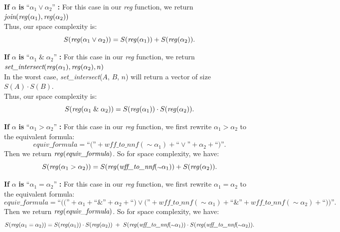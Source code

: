 \documentclass[runningheads]{llncs}
\begin{document}
\textbf{If} $\alpha$ \textbf{is} ``$\alpha_{1} \lor \alpha_{2}$'' \textbf{:}
    For this case in our \emph{reg} function, we return $\textit{join}(\text{\emph{reg}}(\alpha_{1}), \text{\emph{reg}}(\alpha_{2}))$ \\
    Thus, our space complexity is:
    \[
    S(\text{\emph{reg}}(\alpha_{1} \lor \alpha_{2})) = S(\text{\emph{reg}}(\alpha_{1})) + S(\text{\emph{reg}}(\alpha_{2})).
    \]
 

\textbf{If} $\alpha$ \textbf{is} ``$\alpha_{1} \; \& \; \alpha_{2}$'' \textbf{:}
    For this case in our \emph{reg} function, we return $ \textit{set\_intersect}(\text{\emph{reg}}(\alpha_{1}), \text{\emph{reg}}(\alpha_{2}), n)$ \\
    In the worst case, \textit{set\_intersect}($A$, $B$, $n$) will return a vector of size $S(A) \cdot S(B)$.\\
    Thus, our space complexity is:
    \[ 
    S(\text{\emph{reg}}(\alpha_{1} \; \& \; \alpha_{2})) = S(\text{\emph{reg}}(\alpha_{1})) \cdot S(\text{\emph{reg}}(\alpha_{2})).
    \]

\textbf{If} $\alpha$ \textbf{is} ``$\alpha_{1} >  \alpha_{2}$'' \textbf{:}
    For this case in our \emph{reg} function, we first rewrite $\alpha_{1} > \alpha_{2}$ to the equivalent formula:
    \[ 
    \textit{equiv\_formula} = \text{``(''} + \textit{wff\_to\_nnf}(\scriptstyle{\sim}\textstyle \alpha_{1}) + \text{``} \lor \text{''} + \alpha_{2} + \text{``)''}.
    \]
    Then we return $\text{\emph{reg}}(\textit{equiv\_formula})$.
    So for space complexity, we have:
    \[ 
    S(\text{\emph{reg}}(\alpha_{1} > \alpha_{2})) = S(\text{\emph{reg}}(\textit{wff\_to\_nnf}(\scriptstyle{\sim}\textstyle \alpha_{1})) + S(\text{\emph{reg}}(\alpha_{2})).
    \]

\textbf{If} $\alpha$ \textbf{is} ``$\alpha_{1} = \alpha_{2}$'' \textbf{:}
    For this case in our \emph{reg} function, we first rewrite $\alpha_{1} = \alpha_{2}$ to the equivalent formula:
    \[ 
    \textit{equiv\_formula} = 
    \text{``((''} + \alpha_{1} + \text{``} \& \text{''} + \alpha_{2} + \text{``)}
    \lor 
    \text{(''} + \textit{wff\_to\_nnf}(\scriptstyle{\sim}\textstyle \alpha_{1}) + \text{``} \& \text{''} +  \textit{wff\_to\_nnf}(\scriptstyle{\sim}\textstyle \alpha_{2}) + \text{``))''}.
    \]
    Then we return $\text{\emph{reg}}(\textit{equiv\_formula})$.
    So for space complexity, we have:
    \[ 
    S(\text{\emph{reg}}(\alpha_{1} = \alpha_{2})) =
    S(\text{\emph{reg}}(\alpha_{1})) \cdot S(\text{\emph{reg}}(\alpha_{2})) \; + \;  
    S(\text{\emph{reg}}(\textit{wff\_to\_nnf}(\scriptstyle{\sim}\textstyle \alpha_{1})) \cdot S(\text{\emph{reg}}(\textit{wff\_to\_nnf}(\scriptstyle{\sim}\textstyle \alpha_{2})).
    \]
\end{document}
